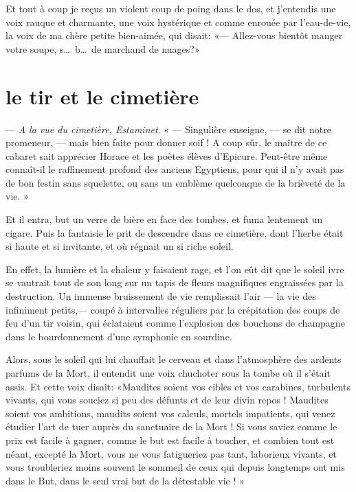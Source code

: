 Et tout à coup je reçus un violent coup de poing dans le dos, et
j’entendis une voix rauque et charmante, une voix
hystérique et comme enrouée par l’eau{}-de{}-vie, la
voix de ma chère petite bien{}-aimée, qui disait: «--- Allez{}-vous
bientôt manger votre soupe, s\ldots\ b\ldots\ de marchand de nuages?»

\quebra\section[Le tir et le cimetière]{le tir et le cimetière}

--- \textit{A la vue du cimetière, Estaminet}. « --- Singulière enseigne, --- se dit
notre promeneur, --- mais bien faite pour donner soif ! A coup sûr, le
maître de ce cabaret sait apprécier Horace et les poètes élèves
d’Epicure. Peut{}-être même connaît{}-il le
raffinement profond des anciens Egyptiens, pour qui il
n’y avait pas de bon festin sans squelette, ou sans un
emblème quelconque de la brièveté de la vie. »

Et il entra, but un verre de bière en face des tombes, et fuma lentement
un cigare. Puis la fantaisie le prit de descendre dans ce cimetière,
dont l’herbe était si haute et si invitante, et où
régnait un si riche soleil.

En effet, la lumière et la chaleur y faisaient rage, et
l’on eût dit que le soleil ivre se vautrait tout de
son long sur un tapis de fleurs magnifiques engraissées par la
destruction. Un immense bruissement de vie remplissait
l’air --- la vie des infiniment petits,--- coupé à
intervalles réguliers par la crépitation des coups de feu
d’un tir voisin, qui éclataient comme
l’explosion des bouchons de champagne dans le
bourdonnement d’une symphonie en sourdine.

Alors, sous le soleil qui lui chauffait le cerveau et dans
l’atmosphère des ardents parfums de la Mort, il
entendit une voix chuchoter sous la tombe où il
s’était assis. Et cette voix disait: «Maudites soient
vos cibles et vos carabines, turbulents vivants, qui vous souciez si
peu des défunts et de leur divin repos ! Maudites soient vos ambitions,
maudits soient vos calculs, mortels impatients, qui venez étudier
l’art de tuer auprès du sanctuaire de la Mort ! Si
vous saviez comme le prix est facile à gagner, comme le but est facile
à toucher, et combien tout est néant, excepté la Mort, vous ne vous
fatigueriez pas tant, laborieux vivants, et vous troubleriez moins
souvent le sommeil de ceux qui depuis longtemps ont mis dans le But,
dans le seul vrai but de la détestable vie ! »

